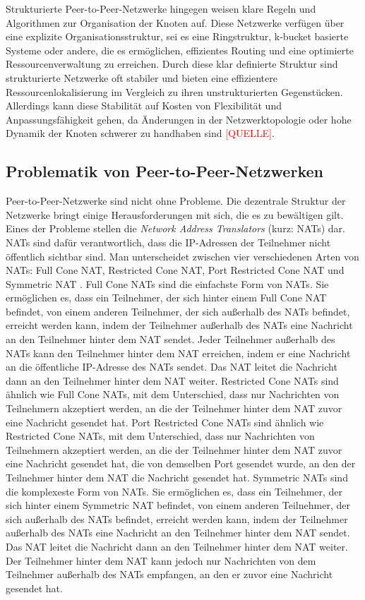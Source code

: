 Strukturierte Peer-to-Peer-Netzwerke hingegen weisen klare Regeln und Algorithmen zur Organisation der Knoten auf. Diese Netzwerke verfügen über eine explizite Organisationsstruktur, sei es eine Ringstruktur, k-bucket basierte Systeme oder andere, die es ermöglichen, effizientes Routing und eine optimierte Ressourcenverwaltung zu erreichen. Durch diese klar definierte Struktur sind strukturierte Netzwerke oft stabiler und bieten eine effizientere Ressourcenlokalisierung im Vergleich zu ihren unstrukturierten Gegenstücken. Allerdings kann diese Stabilität auf Kosten von Flexibilität und Anpassungsfähigkeit gehen, da Änderungen in der Netzwerktopologie oder hohe Dynamik der Knoten schwerer zu handhaben sind \textcolor{red}{[QUELLE]}.



\subsection{Problematik von Peer-to-Peer-Netzwerken}

Peer-to-Peer-Netzwerke sind nicht ohne Probleme. Die dezentrale Struktur der Netzwerke bringt einige Herausforderungen mit sich, die es zu bewältigen gilt. Eines der Probleme stellen die \textit{Network Address Translators} (kurz: NATs) dar. NATs sind dafür verantwortlich, dass die IP-Adressen der Teilnehmer nicht öffentlich sichtbar sind. Man unterscheidet zwischen vier verschiedenen Arten von NATs: Full Cone NAT, Restricted Cone NAT, Port Restricted Cone NAT und Symmetric NAT \parencite[S. 5]{rfc8489_STUN}. Full Cone NATs sind die einfachste Form von NATs. Sie ermöglichen es, dass ein Teilnehmer, der sich hinter einem Full Cone NAT befindet, von einem anderen Teilnehmer, der sich außerhalb des NATs befindet, erreicht werden kann, indem der Teilnehmer außerhalb des NATs eine Nachricht an den Teilnehmer hinter dem NAT sendet. Jeder Teilnehmer außerhalb des NATs kann den Teilnehmer hinter dem NAT erreichen, indem er eine Nachricht an die öffentliche IP-Adresse des NATs sendet. Das NAT leitet die Nachricht dann an den Teilnehmer hinter dem NAT weiter. Restricted Cone NATs sind ähnlich wie Full Cone NATs, mit dem Unterschied, dass nur Nachrichten von Teilnehmern akzeptiert werden, an die der Teilnehmer hinter dem NAT zuvor eine Nachricht gesendet hat. Port Restricted Cone NATs sind ähnlich wie Restricted Cone NATs, mit dem Unterschied, dass nur Nachrichten von Teilnehmern akzeptiert werden, an die der Teilnehmer hinter dem NAT zuvor eine Nachricht gesendet hat, die von demselben Port gesendet wurde, an den der Teilnehmer hinter dem NAT die Nachricht gesendet hat. Symmetric NATs sind die komplexeste Form von NATs. Sie ermöglichen es, dass ein Teilnehmer, der sich hinter einem Symmetric NAT befindet, von einem anderen Teilnehmer, der sich außerhalb des NATs befindet, erreicht werden kann, indem der Teilnehmer außerhalb des NATs eine Nachricht an den Teilnehmer hinter dem NAT sendet. Das NAT leitet die Nachricht dann an den Teilnehmer hinter dem NAT weiter. Der Teilnehmer hinter dem NAT kann jedoch nur Nachrichten von dem Teilnehmer außerhalb des NATs empfangen, an den er zuvor eine Nachricht gesendet hat.






